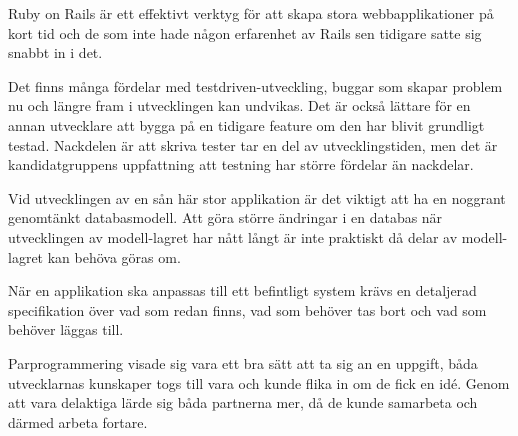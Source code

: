 Ruby on Rails är ett effektivt verktyg för att skapa stora webbapplikationer på kort tid och de som inte hade någon erfarenhet av Rails sen tidigare satte sig snabbt in i det.

Det finns många fördelar med testdriven-utveckling, buggar som skapar problem nu och längre fram i utvecklingen kan undvikas. Det är också lättare för en annan utvecklare att bygga på en tidigare feature om den har blivit grundligt testad. Nackdelen är att skriva tester tar en del av utvecklingstiden, men det är kandidatgruppens uppfattning att testning har större fördelar än nackdelar.

Vid utvecklingen av en sån här stor applikation är det viktigt att ha en noggrant genomtänkt databasmodell. Att göra större ändringar i en databas när utvecklingen av modell-lagret har nått långt är inte praktiskt då delar av modell-lagret kan behöva göras om.

När en applikation ska anpassas till ett befintligt system krävs en detaljerad specifikation över vad som redan finns, vad som behöver tas bort och vad som behöver läggas till.

Parprogrammering visade sig vara ett bra sätt att ta sig an en uppgift, båda utvecklarnas kunskaper togs till vara och kunde flika in om de fick en idé. Genom att vara delaktiga lärde sig båda partnerna mer, då de kunde samarbeta och därmed arbeta fortare.